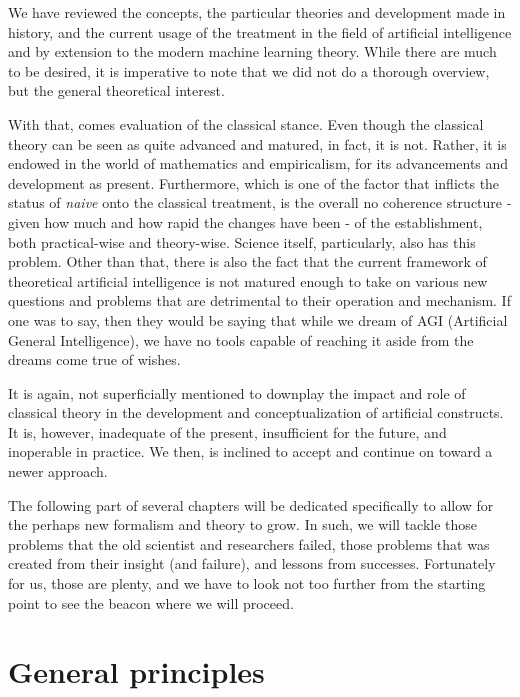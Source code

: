 We have reviewed the concepts, the particular theories and development made in history, and the current usage of the treatment in the field of artificial intelligence and by extension to the modern machine learning theory. While there are much to be desired, it is imperative to note that we did not do a thorough overview, but the general theoretical interest. 

With that, comes evaluation of the classical stance. Even though the classical theory can be seen as quite advanced and matured, in fact, it is not. Rather, it is endowed in the world of mathematics and empiricalism, for its advancements and development as present. Furthermore, which is one of the factor that inflicts the status of \textit{naive} onto the classical treatment, is the overall no coherence structure - given how much and how rapid the changes have been - of the establishment, both practical-wise and theory-wise. Science itself, particularly, also has this problem. Other than that, there is also the fact that the current framework of theoretical artificial intelligence is not matured enough to take on various new questions and problems that are detrimental to their operation and mechanism. If one was to say, then they would be saying that while we dream of AGI (Artificial General Intelligence), we have no tools capable of reaching it aside from the dreams come true of wishes. 

It is again, not superficially mentioned to downplay the impact and role of classical theory in the development and conceptualization of artificial constructs. It is, however, inadequate of the present, insufficient for the future, and inoperable in practice. We then, is inclined to accept and continue on toward a newer approach. 

The following part of several chapters will be dedicated specifically to allow for the perhaps new formalism and theory to grow. In such, we will tackle those problems that the old scientist and researchers failed, those problems that was created from their insight (and failure), and lessons from successes. Fortunately for us, those are plenty, and we have to look not too further from the starting point to see the beacon where we will proceed. 

\chapter{General principles}


